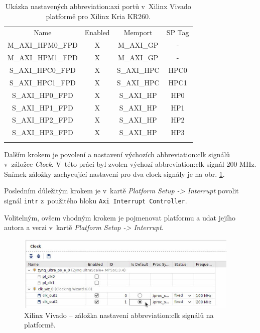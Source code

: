 \documentclass[a4paper, twoside, 11pt]{article}
\begin{document}
				\begin{table}[H]
					\centering
					\caption{Ukázka nastavených \gls{abbreviation:axi} portů v~Xilinx Vivado platformě pro Xilinx Kria KR260.}
				  \vspace*{0.15cm}
				
					\begin{tabular}{!{\vrule width 2pt} c | c | c | c !{\vrule width 2pt}}
					Name & Enabled & Memport & SP Tag\\
					M\_AXI\_HPM0\_FPD & X & M\_AXI\_GP & -\\ \hline
					M\_AXI\_HPM1\_FPD & X & M\_AXI\_GP & -\\ \hline
					S\_AXI\_HPC0\_FPD & X & S\_AXI\_HPC & HPC0\\ \hline
					S\_AXI\_HPC1\_FPD & X & S\_AXI\_HPC & HPC1\\ \hline
					S\_AXI\_HP0\_FPD & X & S\_AXI\_HP & HP0\\ \hline
					S\_AXI\_HP1\_FPD & X & S\_AXI\_HP & HP1\\ \hline
					S\_AXI\_HP2\_FPD & X & S\_AXI\_HP & HP2\\ \hline
					S\_AXI\_HP3\_FPD & X & S\_AXI\_HP & HP3\\ 
					\end{tabular}
					\label{tab:vivado-platform-setup-axi-xilinx-kria}
				\end{table}

				Dalším krokem je povolení a nastavení výchozích \gls{abbreviation:clk} signálů v~záložce \textit{Clock}. V~této práci byl zvolen výchozí \gls{abbreviation:clk} signál 200 MHz. Snímek záložky zachycující nastavení pro dva clock signály je na obr. \ref{fig:kr26-xilix-vivado-flow-14}.\par
				Posledním důležitým krokem je v~kartě \textit{Platform Setup -> Interrupt} povolit signál \texttt{intr} z~použitého bloku \texttt{Axi Interrupt Controller}.\par
				Volitelným, ovšem vhodným krokem je pojmenovat platformu a udat jejího autora a verzi v~kartě \textit{Platform Setup -> Interrupt}.

				\begin{figure}[htbp!]
					\centering
					\includegraphics[width=0.95\textwidth]{src/png/kr26-xilinx-vivado-flow/kr26-xilix-vivado-flow-14.jpg}
					\caption{Xilinx Vivado – záložka nastavení \gls{abbreviation:clk} signálů na platformě.}
					\label{fig:kr26-xilix-vivado-flow-14}
				\end{figure}
\end{document}

